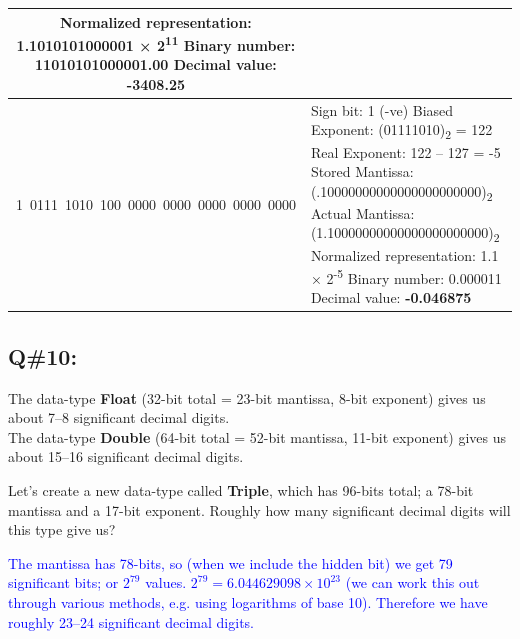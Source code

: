 \begin{longtable}{|c|p{10cm}|}
Normalized representation: 1.1010101000001 × 2\textsuperscript{11} \newline
Binary number: 11010101000001.00 \newline
Decimal value: \textbf{-3408.25} \\
\hline
1\ 0111\ 1010\ 100\ 0000\ 0000\ 0000\ 0000\ 0000 & 
Sign bit: 1 (-ve) \newline
Biased Exponent: (01111010)\textsubscript{2} = 122 \newline
Real Exponent: 122 – 127 = -5 \newline
Stored Mantissa: (.10000000000000000000000)\textsubscript{2} \newline
Actual Mantissa: (1.10000000000000000000000)\textsubscript{2} \newline
Normalized representation: 1.1 × 2\textsuperscript{-5} \newline
Binary number: 0.000011 \newline
Decimal value: \textbf{-0.046875} \\
\hline
\end{longtable}

\subsection{Q\#10:}
The data-type \textbf{Float} (32-bit total = 23-bit mantissa, 8-bit exponent) gives us about 7–8 significant decimal digits. \\
The data-type \textbf{Double} (64-bit total = 52-bit mantissa, 11-bit exponent) gives us about 15–16 significant decimal digits.

\vspace{0.5em}
Let's create a new data-type called \textbf{Triple}, which has 96-bits total; a 78-bit mantissa and a 17-bit exponent. Roughly how many significant decimal digits will this type give us?

\textcolor{blue}{
The mantissa has 78-bits, so (when we include the hidden bit) we get 79 significant bits; or $2^{79}$ values.
$2^{79} = 6.044629098 \times 10^{23}$ 
(we can work this out through various methods, e.g. using logarithms of base 10). Therefore we have
roughly 23–24 significant decimal digits.
}